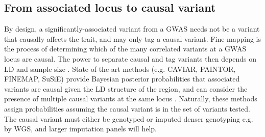 \begin{outline}

\subsection{From associated locus to causal variant}

\1 By design, a significantly-associated variant from a \gls{GWAS} needs not be a variant that causally affects the trait, and may only tag a causal variant.
    \2 Fine-mapping is the process of determining which of the many correlated variants at a \gls{GWAS} locus are causal.
    \2 The power to separate causal and tag variants then depends on \gls{LD} and sample size \autocite{visscher201710YearsGWAS}.
    \2 State-of-the-art methods (e.g. CAVIAR, PAINTOR, FINEMAP, SuSiE) provide Bayesian posterior probabilities that associated variants are causal given the \gls{LD} structure of the region, and can consider the presence of multiple causal variants at the same locus \autocite{schaid2018GenomewideAssociationsCandidate}.
    \2 Naturally, these methods assign probabilities assuming the causal variant is in the set of variants tested.
    \2 The causal variant must either be genotyped or imputed denser genotyping e.g. by WGS, and larger imputation panels will help.


\end{outline}
